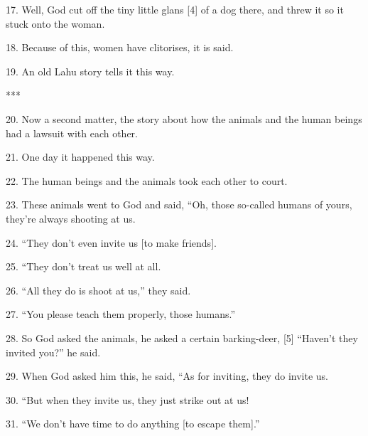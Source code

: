 {\LARGE{}17. Well, God cut off the tiny little glans [4] of a dog there, and threw
it so it stuck onto the woman.}

{\LARGE{}18. Because of this, women have clitorises, it is said.}

{\LARGE{}19. An old Lahu story tells it this way.}

{\LARGE{}***}

{\LARGE{}20. Now a second matter, the story about how the animals and the human
beings had a lawsuit with each other.}

{\LARGE{}21. One day it happened this way.}

{\LARGE{}22. The human beings and the animals took each other to court.}

{\LARGE{}23. These animals went to God and said, ``Oh, those so-called humans of
yours, they're always shooting at us.}

{\LARGE{}24. ``They don't even invite us [to make friends].}

{\LARGE{}25. ``They don't treat us well at all.}

{\LARGE{}26. ``All they do is shoot at us,'' they said.}

{\LARGE{}27. ``You please teach them properly, those humans.''}

{\LARGE{}28. So God asked the animals, he asked a certain barking-deer, [5] ``Haven't
they invited you?'' he said.}

{\LARGE{}29. When God asked him this, he said, ``As for inviting, they do invite
us.}

{\LARGE{}30. ``But when they invite us, they just strike out at us!}

{\LARGE{}31. ``We don't have time to do anything [to escape them].''}


